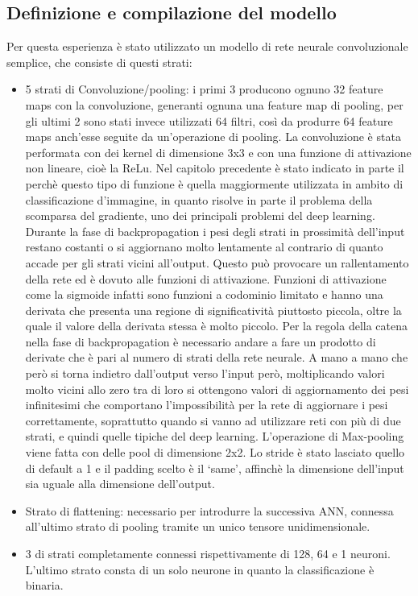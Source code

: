 \subsection{Definizione e compilazione del modello}
Per questa esperienza è stato utilizzato un modello di rete neurale convoluzionale semplice, che consiste di questi strati:\\
\begin{itemize}
\item 5 strati di Convoluzione/pooling: i primi 3 producono ognuno 32 feature maps con la convoluzione, 
generanti ognuna una feature map di pooling, per gli ultimi 2 sono stati invece utilizzati 64 filtri, 
così da produrre 64 feature maps anch’esse seguite da un’operazione di pooling. La convoluzione è stata performata
 con dei kernel di dimensione 3x3 e con una funzione di attivazione non lineare, cioè la ReLu. Nel capitolo precedente
  è stato indicato in parte il perchè questo tipo di funzione è quella maggiormente utilizzata in ambito di
   classificazione d’immagine, in quanto risolve in parte il problema della scomparsa del gradiente, uno dei 
   principali problemi del deep learning. Durante la fase di backpropagation i pesi degli strati in
    prossimità dell’input restano costanti o si aggiornano molto lentamente al contrario di quanto 
    accade per gli strati vicini all’output. Questo può provocare un rallentamento della rete ed è dovuto 
    alle funzioni di attivazione. Funzioni di attivazione come la sigmoide infatti sono funzioni a codominio
     limitato e hanno una derivata
      che presenta una regione di significatività piuttosto piccola, oltre la quale il valore della derivata stessa
       è molto piccolo. Per la regola della catena nella fase di backpropagation è necessario andare a fare un
        prodotto di derivate che è pari al numero di strati della rete neurale. A mano a mano che però si torna 
        indietro dall’output verso l’input però, moltiplicando valori molto vicini allo zero tra di loro si
         ottengono valori di aggiornamento dei pesi infinitesimi che comportano l'impossibilità per la rete
          di aggiornare i pesi correttamente, soprattutto quando si vanno ad utilizzare reti con più di due strati, e quindi quelle tipiche del deep learning.
           L'operazione di Max-pooling viene fatta con delle pool di dimensione
           2x2. Lo stride è stato lasciato quello di default a 1 e il padding scelto è il ‘same’, affinchè la
            dimensione dell’input sia uguale alla dimensione dell’output. 
\item Strato di flattening: necessario per introdurre la successiva ANN, connessa all’ultimo strato
 di pooling tramite un unico tensore unidimensionale.
\item 3 di strati completamente connessi rispettivamente di 128, 64 e 1 neuroni. 
L’ultimo strato consta di un solo neurone in quanto la classificazione è binaria. 
\end{itemize}

